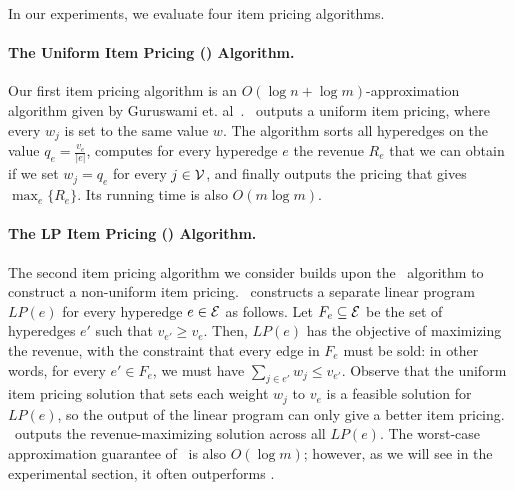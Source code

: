 
In our experiments, we evaluate four item pricing algorithms.

\paragraph{The Uniform Item Pricing (\uip) Algorithm.}
Our first item pricing algorithm is an $O(\log n + \log m)$-approximation algorithm given by Guruswami et. al~\cite{guruswami2005profit}. \uip\ outputs a uniform item pricing,
where every $w_j$ is set to the same value $w$. The algorithm sorts all hyperedges on the value $q_e = \frac{v_e}{|e|}$, computes for every hyperedge $e$  
the revenue $R_e$ that we can obtain if we set $w_j = q_e$ for every $j \in \mathcal{V}$, and finally outputs the pricing that gives $\max_e \{ R_e\}$. Its running time is also $O(m \log m)$.


\paragraph{The LP Item Pricing (\lpip) Algorithm.}

The second item pricing algorithm we consider builds upon the \uip\ algorithm to construct a non-uniform item pricing. \lpip\ constructs a separate linear program $LP(e)$ for every hyperedge $e \in \mathcal{E}$ as follows. Let $F_e \subseteq \mathcal{E}$ be the set of hyperedges $e'$ such that $v_{e'} \geq v_e$. Then, $LP(e)$ has the objective of maximizing the revenue,
with the constraint that every edge in $F_e$ must be sold: in other words, for every $e' \in F_e$, we must have $\sum_{j \in e'} w_j \leq v_{e'}$. Observe that the uniform item pricing
solution that sets each weight $w_j$ to $v_e$ is a feasible solution for $LP(e)$, so the output of the linear program can only give a better item pricing. \lpip\ outputs the revenue-maximizing solution across all $LP(e)$. The worst-case approximation guarantee of \lpip\ is also $O(\log m)$; however, as we will see in the experimental section, it often outperforms \uip.

